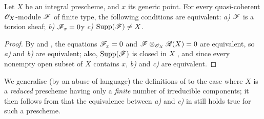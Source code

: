\begin{prop}[7.4.6]
\label{1.7.4.6}
Let $X$ be an integral prescheme, and $x$ its generic point.
For every quasi-coherent $\mathscr{O}_X$-module $\mathscr{F}$ of finite type, the following conditions are equivalent: \emph{a)} $\mathscr{F}$ is a torsion sheaf; \emph{b)} $\mathscr{F}_x=0$y \emph{c)} ${\mathop{\mathrm{Supp}}\nolimits}(\mathscr{F})\neq X$.
\end{prop}

\begin{proof}
\label{proof-1.7.4.6}
By  and , the equations $\mathscr{F}_x=0$ and $\mathscr{F}\otimes_{\mathscr{O}_X}\mathscr{R}(X)=0$ are equivalent, so \emph{a)} and \emph{b)} are equivalent; also, ${\mathop{\mathrm{Supp}}\nolimits}(\mathscr{F})$ is closed in $X$ , and since every nonempty open subset of $X$ contains $x$, \emph{b)} and \emph{c)} are equivalent.
\end{proof}

\begin{env}[7.4.7]
\label{1.7.4.7}
We generalise (by an abuse of language) the definitions of  to the case where $X$ is a \emph{reduced} prescheme having only a \emph{finite} number of irreducible components; it then follows from  that the equivalence between \emph{a)} and \emph{c)} in  still holds true for such a prescheme.
\end{env}
